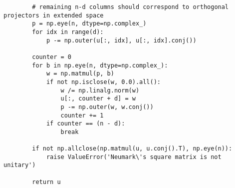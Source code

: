 \begin{verbatim}
        # remaining n-d columns should correspond to orthogonal projectors in extended space
        p = np.eye(n, dtype=np.complex_)
        for idx in range(d):
            p -= np.outer(u[:, idx], u[:, idx].conj())

        counter = 0
        for b in np.eye(n, dtype=np.complex_):
            w = np.matmul(p, b)
            if not np.isclose(w, 0.0).all():
                w /= np.linalg.norm(w)
                u[:, counter + d] = w
                p -= np.outer(w, w.conj())
                counter += 1
            if counter == (n - d):
                break

        if not np.allclose(np.matmul(u, u.conj().T), np.eye(n)):
            raise ValueError('Neumark\'s square matrix is not unitary')

        return u
\end{verbatim}
\newpage
